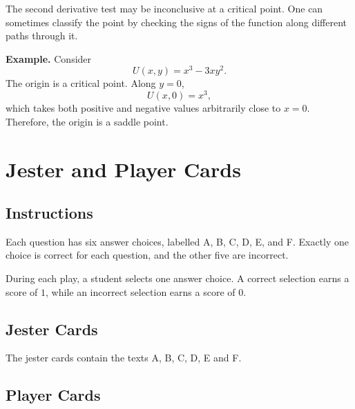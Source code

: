 \documentclass[a4paper,12pt]{article}
\theoremstyle{mystyle}
\numberwithin{equation}{section}
\numberwithin{theorem}{section}
\numberwithin{proposition}{section}
\numberwithin{example}{section}
\numberwithin{remark}{section}
\numberwithin{lemma}{section}
\numberwithin{corollary}{section}
\numberwithin{definition}{section}
\begin{document}
The second derivative test may be inconclusive at a critical point.
One can sometimes classify the point by checking the signs of the
function along different paths through it.

\textbf{Example.}
Consider
\[
U(x,y)=x^3-3xy^2.
\]
The origin is a critical point. Along \(y=0\),
\[
U(x,0)=x^3,
\]
which takes both positive and negative values arbitrarily close
to \(x=0\). Therefore, the origin is a saddle point.


\section{Jester and Player Cards}
\label{S:3}
\subsection{Instructions}

Each question has six answer choices, labelled
A, B, C, D, E, and F. Exactly one choice is correct
for each question, and the other five are incorrect.

During each play, a student selects one answer choice.
A correct selection earns a score of $1$, while an
incorrect selection earns a score of $0$.


\subsection{Jester Cards}

The jester cards contain the texts A, B, C, D, E and F.

\subsection{Player Cards}
\end{document}
